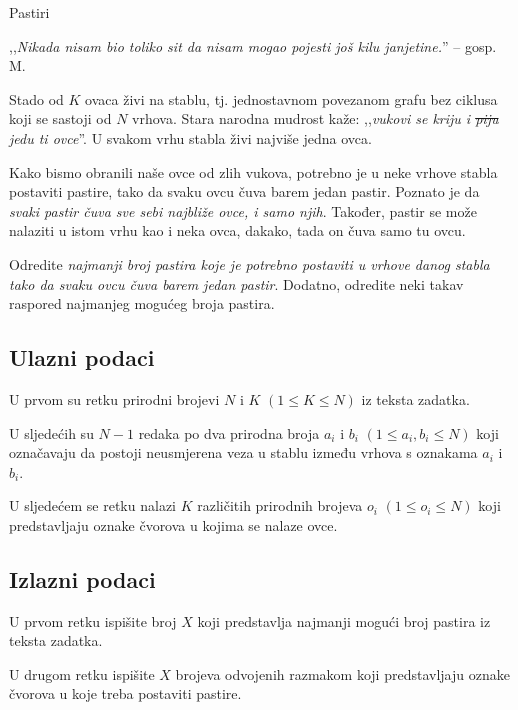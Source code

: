 \begin{statement}[
  problempoints=100,
  timelimit=1 sekunda,
  memorylimit=512 MiB,
]{Pastiri}

,,\textit{Nikada nisam bio toliko sit da nisam mogao pojesti još kilu janjetine.}''
  -- gosp. M.

Stado od $K$ ovaca živi na stablu, tj. jednostavnom povezanom grafu bez ciklusa
koji se sastoji od $N$ vrhova. Stara narodna mudrost kaže: ,,\textit{vukovi
se kriju i \sout{piju} jedu ti ovce}''. U svakom vrhu stabla živi najviše jedna ovca.

Kako bismo obranili naše ovce od zlih
vukova, potrebno je u neke vrhove stabla postaviti pastire, tako da svaku
ovcu čuva barem jedan pastir. Poznato je da \emph{svaki pastir čuva sve
sebi najbliže ovce, i samo njih}. Također, pastir se može nalaziti u istom vrhu
kao i neka ovca, dakako, tada on čuva samo tu ovcu.

Odredite \emph{najmanji broj pastira koje je potrebno postaviti u vrhove danog
stabla tako da svaku ovcu čuva barem jedan pastir}. Dodatno, odredite neki takav
raspored najmanjeg mogućeg broja pastira.

\subsection*{Ulazni podaci}
U prvom su retku prirodni brojevi $N$ i $K$ $(1 \le K \le N)$ iz teksta zadatka.

U sljedećih su $N-1$ redaka po dva prirodna broja $a_i$ i $b_i$ $(1 \le a_i, b_i \le N)$ koji
označavaju da postoji neusmjerena veza u stablu između vrhova s oznakama $a_i$ i $b_i$.

U sljedećem se retku nalazi $K$ različitih prirodnih brojeva $o_i$ $(1 \le o_i \le N)$ koji
predstavljaju oznake čvorova u kojima se nalaze ovce. 

\subsection*{Izlazni podaci}
U prvom retku ispišite broj $X$ koji predstavlja najmanji mogući broj pastira
iz teksta zadatka.

U drugom retku ispišite $X$ brojeva odvojenih razmakom koji predstavljaju oznake
čvorova u koje treba postaviti pastire.


\end{statement}
